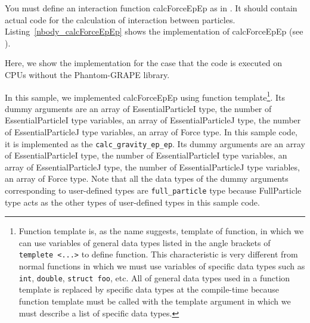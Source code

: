 You must define an interaction function \textsf{calcForceEpEp} as \procedure in \progLangName. It should contain actual code for the calculation of interaction between particles. Listing~\ref{nbody_calcForceEpEp} shows the implementation of \textsf{calcForceEpEp} (see ).

\ifCpp %

\endifCpp
\ifFtn %

\endifFtn
\ifC %

\endifC
\ifCpp %
Here, we show the implementation for the case that the code is executed on CPUs without the Phantom-GRAPE library.

In this sample, we implemented \textsf{calcForceEpEp} using function template\footnote{Function template is, as the name suggests, template of function, in which we can use variables of general data types listed in the angle brackets of \texttt{templete <...>} to define function. This characteristic is very different from normal functions in which we must use variables of specific data types such as \texttt{int}, \texttt{double}, \texttt{struct foo}, etc. All of general data types used in a function template is replaced by specific data types at the compile-time because function template must be called with the template argument in which we must describe a list of specific data types.}. Its dummy arguments are an array of \textsf{EssentialParticleI} type, the number of \textsf{EssentialParticleI} type variables, an array of \textsf{EssentialParticleJ} type, the number of \textsf{EssentialParticleJ} type variables, an array of \textsf{Force} type.
\endifCpp
\ifIF %
In this sample code, it is implemented as the \procedure \texttt{calc\_gravity\_ep\_ep}. Its dummy arguments are an array of \textsf{EssentialParticleI} type, the number of \textsf{EssentialParticleI} type variables, an array of \textsf{EssentialParticleJ} type, the number of \textsf{EssentialParticleJ} type variables, an array of \textsf{Force} type. Note that all the data types of the dummy arguments corresponding to user-defined types are \texttt{full\_particle} type because \textsf{FullParticle} type acts as the other types of user-defined types in this sample code.
\endifIF

